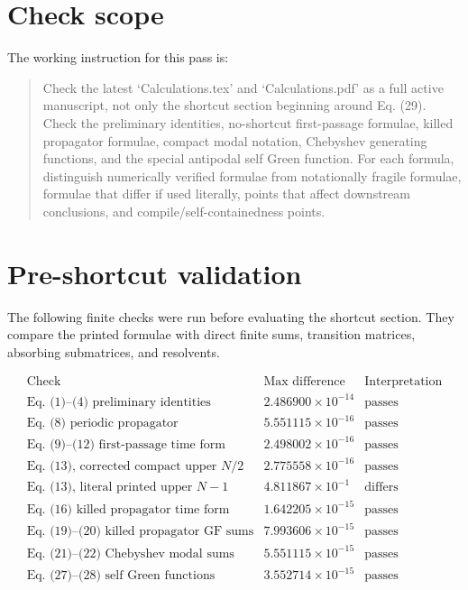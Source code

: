 \documentclass[11pt]{article}
\begin{document}
\section*{Check scope}

The working instruction for this pass is:

\begin{quote}
Check the latest `Calculations.tex' and `Calculations.pdf' as a full active
manuscript, not only the shortcut section beginning around Eq. (29).  Check the
preliminary identities, no-shortcut first-passage formulae, killed propagator
formulae, compact modal notation, Chebyshev generating functions, and the
special antipodal self Green function.  For each formula, distinguish
numerically verified formulae from notationally fragile formulae, formulae that
differ if used literally, points that affect downstream conclusions, and
compile/self-containedness points.
\end{quote}

\section*{Pre-shortcut validation}

The following finite checks were run before evaluating the shortcut section.
They compare the printed formulae with direct finite sums, transition matrices,
absorbing submatrices, and resolvents.

\[
\begin{array}{lll}
\text{Check} & \text{Max difference} & \text{Interpretation}\\
\hline
\text{Eq. (1)--(4) preliminary identities} & 2.486900\times10^{-14} & \text{passes}\\
\text{Eq. (8) periodic propagator} & 5.551115\times10^{-16} & \text{passes}\\
\text{Eq. (9)--(12) first-passage time form} & 2.498002\times10^{-16} & \text{passes}\\
\text{Eq. (13), corrected compact upper }N/2 & 2.775558\times10^{-16} & \text{passes}\\
\text{Eq. (13), literal printed upper }N-1 & 4.811867\times10^{-1} & \text{differs}\\
\text{Eq. (16) killed propagator time form} & 1.642205\times10^{-15} & \text{passes}\\
\text{Eq. (19)--(20) killed propagator GF sums} & 7.993606\times10^{-15} & \text{passes}\\
\text{Eq. (21)--(22) Chebyshev modal sums} & 5.551115\times10^{-15} & \text{passes}\\
\text{Eq. (27)--(28) self Green functions} & 3.552714\times10^{-15} & \text{passes}
\end{array}
\]
\end{document}
